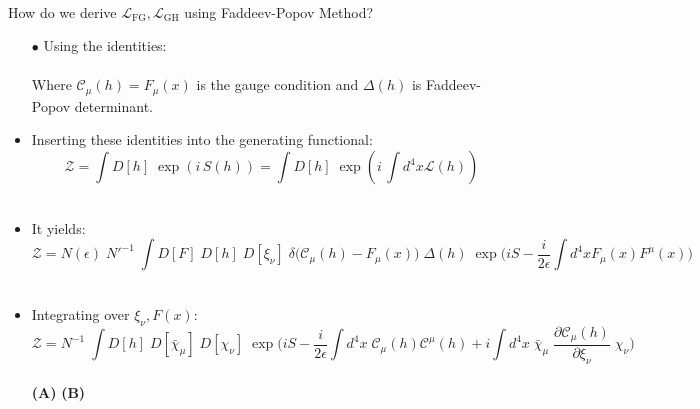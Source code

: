 \documentclass[aspectratio=169,usenames,dvipsnames]{beamer}
\begin{document}
\begin{frame}{\centering {}\\ \small How
    do we derive $\mathcal{L}_{\text{FG}},\mathcal{L}_{\text{GH}}$ using Faddeev-Popov Method?} \footnotesize
  \begin{itemize}
     \item[$\bullet$] Using the identities:\\ 
     \;\;  \;\;   \\ \vspace{1mm}
    \scriptsize Where $\mathcal{C}_{\mu}(h) = F_{\mu}(x)$ is the gauge condition and $\Delta(h)$ is
    Faddeev-Popov determinant.\\ \vspace{2mm} \footnotesize
    \item<only@1>[$\bullet$] Inserting these identities into the generating functional: \footnotesize
    $$   \mathcal{Z} = \int D[h] \; \exp( i \, S(h)  ) = \int D[h] \; \exp( i
    \,\int d^4x  \mathcal{L} (h)  )  $$ \\
    \item<2->[$\bullet$] It yields: \footnotesize
    $$   \mathcal{Z} = N(\epsilon) \; N'^{-1} \; \int D[F] \; D[h] \; D[\xi_{\nu}]
    \; \delta \Big (  \mathcal{C}_{\mu} (h) - F_{\mu}(x) \Big ) \; \Delta(h) \; \exp \Big ( i
    S - \frac{i}{2\epsilon} \int d^4 x  F_{\mu}(x)F^{\mu}(x) \Big ) $$ \\ \vspace{2mm}
    \item<2->[$\bullet$] Integrating over \(\xi_{\nu}, F(x) \): \footnotesize
    $$  \mathcal{Z} = N^{-1} \; \int D[h] \; D[\bar{\chi}_{\mu}] \; D[\chi_{\nu}]  \; \exp \Big ( i S -
    \frac{i}{2\epsilon} \int d^4 x \; \mathcal{C}_{\mu}(h) \mathcal{C}^{\mu}(h)  + i \int d^4 x \; \bar{\chi}_{\mu}
    \; \frac{\partial \mathcal{C}_{\mu}(h) }{\partial \xi_{\nu}} \; \chi_{\nu} \Big )  $$
    \\ \vspace{2mm}
      \small \hspace{15mm} \textbf{(A)}   \hspace{75mm} \textbf{(B)} \\
     \hfill {}
\end{itemize}
\end{frame}
\end{document}
